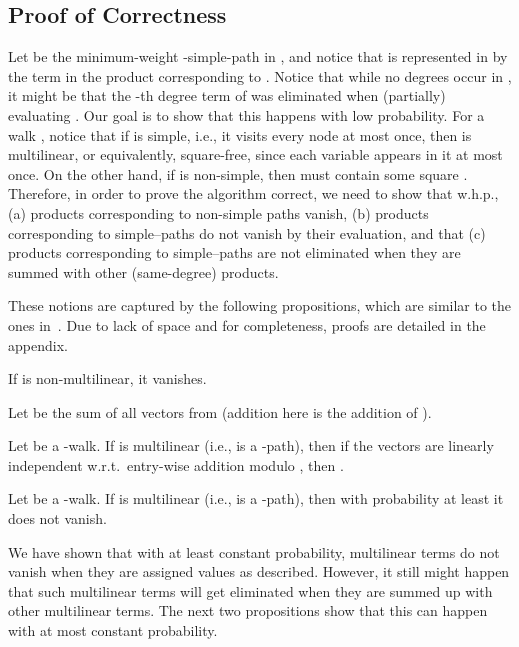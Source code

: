 \documentclass{llncs}
\begin{document}
\subsection{Proof of Correctness}
Let  be the minimum-weight -simple-path in , and notice that  is represented in  by the term  in the product corresponding to . Notice that while no degrees  occur in , it might be that the -th degree term of  was eliminated when (partially) evaluating . Our goal is to show that this happens with low probability. For a walk , notice that if  is simple, i.e., it visits every node at most once, then  is multilinear, or equivalently, square-free, since each variable  appears in it at most once. On the other hand, if  is non-simple, then  must contain some square . Therefore, in order to prove the algorithm correct, we need to show that w.h.p., (a) products corresponding to non-simple paths vanish, (b) products corresponding to simple--paths do not vanish by their evaluation, and that (c) products corresponding to simple--paths are not eliminated when they are summed with other (same-degree) products. 

These notions are captured by the following propositions, which are similar to the ones in~\cite{Williams09}. 
Due to lack of space and for completeness, proofs are detailed in the appendix.

\begin{proposition}\label{pro:vanish}
If  is non-multilinear, it vanishes.
\end{proposition}

Let  be the sum of all vectors from  (addition here is the addition of ).

\begin{proposition}\label{thr:independent}
Let  be a -walk. If  is multilinear (i.e.,  is a -path), then if the vectors  are linearly independent w.r.t.\ entry-wise addition modulo , then .
\end{proposition}

\begin{corollary}\label{cor:2}
Let  be a -walk. If  is multilinear (i.e.,  is a -path), then with probability at least  it does not vanish.
\end{corollary}

We have shown that with at least constant probability, multilinear terms do not vanish when they are assigned values as described. However, it still might happen that such multilinear terms will get eliminated when they are summed up with other multilinear terms. The next two propositions show that this can happen with at most constant probability.
\end{document}

